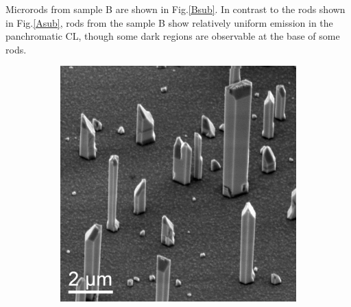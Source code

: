 Microrods from sample B are shown in Fig.\ref{Bsub}. In contrast to the rods shown in Fig.\ref{Asub}, rods from the sample B show relatively uniform emission in the panchromatic CL, though some dark regions are observable at the base of some rods.

\begin{figure}[th]
	\begin{subfigure}[b]{0.4\textwidth}
		\centering
		\includegraphics[width=1\linewidth]{Figs/Ch6/SEM_7481x}
		\caption{}
		

\end{subfigure}
\end{figure}
